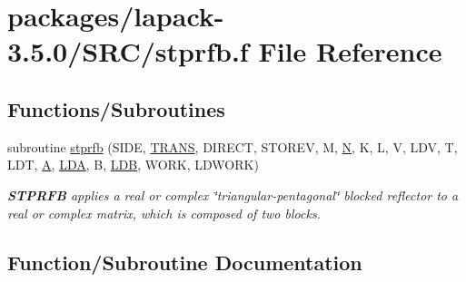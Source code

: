 \hypertarget{stprfb_8f}{}\section{packages/lapack-\/3.5.0/\+S\+R\+C/stprfb.f File Reference}
\label{stprfb_8f}
\subsection*{Functions/\+Subroutines}
\begin{DoxyCompactItemize}
\item 
subroutine \hyperlink{stprfb_8f_af633e78eeb9a85e068655abd15f04ca5}{stprfb} (S\+I\+D\+E, \hyperlink{superlu__enum__consts_8h_a0c4e17b2d5cea33f9991ccc6a6678d62a1f61e3015bfe0f0c2c3fda4c5a0cdf58}{T\+R\+A\+N\+S}, D\+I\+R\+E\+C\+T, S\+T\+O\+R\+E\+V, M, \hyperlink{polmisc_8c_a0240ac851181b84ac374872dc5434ee4}{N}, K, L, V, L\+D\+V, T, L\+D\+T, \hyperlink{classA}{A}, \hyperlink{example__user_8c_ae946da542ce0db94dced19b2ecefd1aa}{L\+D\+A}, B, \hyperlink{example__user_8c_a50e90a7104df172b5a89a06c47fcca04}{L\+D\+B}, W\+O\+R\+K, L\+D\+W\+O\+R\+K)
\begin{DoxyCompactList}\small\item\em {\bfseries S\+T\+P\+R\+F\+B} applies a real or complex \char`\"{}triangular-\/pentagonal\char`\"{} blocked reflector to a real or complex matrix, which is composed of two blocks. \end{DoxyCompactList}\end{DoxyCompactItemize}


\subsection{Function/\+Subroutine Documentation}
\hypertarget{stprfb_8f_af633e78eeb9a85e068655abd15f04ca5}{}
